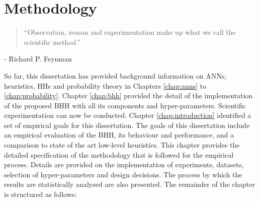 \chapter{Methodology}\label{chap:methodology}

\begin{quotation}
      ``Observation, reason and experimentation make up what we call the scientific method.''
\end{quotation}
\begin{flushright}
      - Richard P. Feynman
\end{flushright}

So far, this dissertation has provided background information on \acfp{ANN}, heuristics, \acp{HH} and probability theory in Chapters \ref{chap:anns} to \ref{chap:probability}. Chapter \ref{chap:bhh} provided the detail of the implementation of the proposed \acs{BHH} with all its components and hyper-parameters. Scientific experimentation can now be conducted. Chapter \ref{chap:introduction} identified a set of empirical goals for this dissertation. The goals of this dissertation include an empirical evaluation of the \acs{BHH}, its behaviour and performance, and a comparison to state of the art low-level heuristics. This chapter provides the detailed specification of the methodology that is followed for the empirical process. Details are provided on the implementation of experiments, datasets, selection of hyper-parameters and design decisions. The process by which the results are statistically analysed are also presented. The remainder of the chapter is structured as follows:

